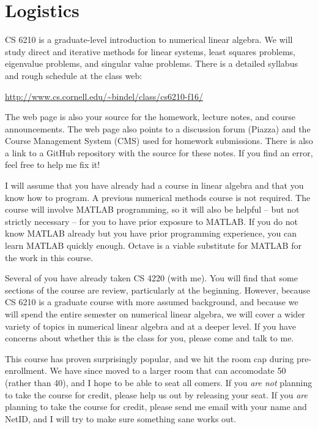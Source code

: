 
\section{Logistics}

CS 6210 is a graduate-level introduction to numerical linear algebra. We
will study direct and iterative methods for linear systems, least
squares problems, eigenvalue problems, and singular value problems.
There is a detailed syllabus and rough schedule at the class web:
\begin{center}
  \url{http://www.cs.cornell.edu/~bindel/class/cs6210-f16/}
\end{center}
The web page is also your source for the homework, lecture notes,
and course announcements.  The web page also points to a discussion
forum (Piazza) and the Course Management System (CMS) used for homework
submissions.  There is also a link to a GitHub repository with
the source for these notes.  If you find an error, feel free to
help me fix it!

I will assume that you have already had a course in linear algebra and
that you know how to program.  A previous numerical methods course  is
not required.  The course will involve MATLAB programming, so it will
also be helpful -- but not strictly necessary -- for you to have prior
exposure to MATLAB.  If you do not know MATLAB already but you have
prior programming experience, you can learn MATLAB quickly enough.
Octave is a viable substitute for MATLAB for the work in this course.

Several of you have already taken CS 4220 (with me).  You will find that
some sections of the course are review, particularly at the beginning.
However, because CS 6210 is a graduate course with more assumed
background, and because we will spend the entire semester on numerical
linear algebra, we will cover a wider variety of topics in numerical
linear algebra and at a deeper level.  If you have concerns about
whether this is the class for you, please come and talk to me.

This course has proven surprisingly popular, and we hit the room cap
during pre-enrollment.  We have since moved to a larger room that can
accomodate 50 (rather than 40), and I hope to be able to seat all comers.
If you {\em are not} planning to take the course for credit, please
help us out by releasing your seat.  If you {\em are} planning to take
the course for credit, please send me email with your name and NetID,
and I will try to make sure something sane works out.
